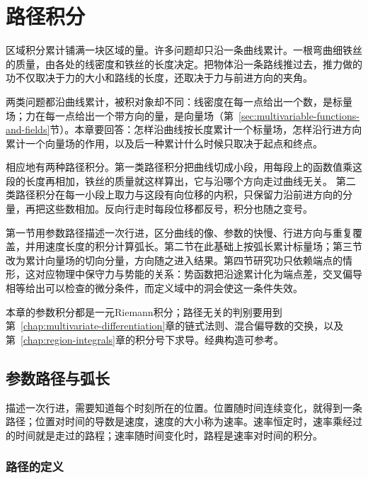 \par{}
\chapter{路径积分}
\label{sec:multivariable-path-integration}
\label{chap:path-integrals}

区域积分累计铺满一块区域的量。许多问题却只沿一条曲线累计。一根弯曲细铁丝的质量，由各处的线密度和铁丝的长度决定。把物体沿一条路线推过去，推力做的功不仅取决于力的大小和路线的长度，还取决于力与前进方向的夹角。

两类问题都沿曲线累计，被积对象却不同：线密度在每一点给出一个数，是标量场；力在每一点给出一个带方向的量，是向量场（第~\ref{sec:multivariable-functions-and-fields}节）。本章要回答：怎样沿曲线按长度累计一个标量场，怎样沿行进方向累计一个向量场的作用，以及后一种累计什么时候只取决于起点和终点。

相应地有两种路径积分。第一类路径积分把曲线切成小段，用每段上的函数值乘这段的长度再相加，铁丝的质量就这样算出，它与沿哪个方向走过曲线无关。
第二类路径积分在每一小段上取力与这段有向位移的内积，只保留力沿前进方向的分量，再把这些数相加。反向行走时每段位移都反号，积分也随之变号。

第一节用参数路径描述一次行进，区分曲线的像、参数的快慢、行进方向与重复覆盖，并用速度长度的积分计算弧长。第二节在此基础上按弧长累计标量场；第三节改为累计向量场的切向分量，方向随之进入结果。第四节研究功只依赖端点的情形，这对应物理中保守力与势能的关系：势函数把沿途累计化为端点差，交叉偏导相等给出可以检查的微分条件，而定义域中的洞会使这一条件失效。

本章的参数积分都是一元Riemann积分；路径无关的判别要用到第~\ref{chap:multivariate-differentiation}章的链式法则、混合偏导数的交换，以及第~\ref{chap:region-integrals}章的积分号下求导。经典构造可参考。

\section{参数路径与弧长}
\label{sec:multivariable-line-integrals}

描述一次行进，需要知道每个时刻所在的位置。位置随时间连续变化，就得到一条路径；位置对时间的导数是速度，速度的大小称为速率。速率恒定时，速率乘经过的时间就是走过的路程；速率随时间变化时，路程是速率对时间的积分。

\subsection{路径的定义}

